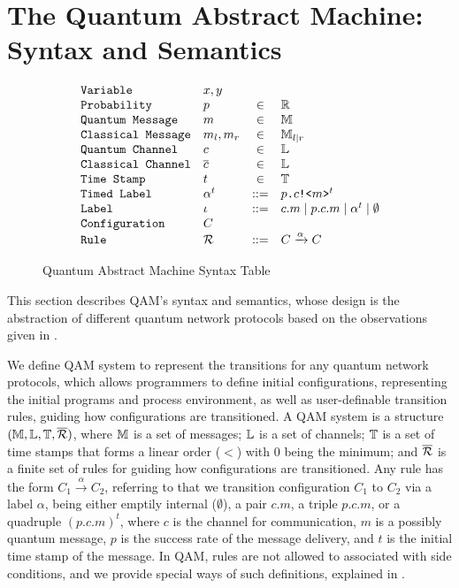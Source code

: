 \section{The Quantum Abstract Machine:  Syntax and Semantics} \label{sec:qam}

\begin{figure}[t]
{\small
  \[\begin{array}{llcl} 
      \texttt{Variable} & x,y \\
      \texttt{Probability} & p &\in &\mathbb{R}\\
      \texttt{Quantum Message} & m &\in& \mathbb{M}\\
      \texttt{Classical Message} & m_l,m_r &\in& \mathbb{M}_{l\mid r}\\
    \texttt{Quantum Channel} & c &\in& \mathbb{L}\\
    \texttt{Classical Channel} & \overline{c} &\in& \mathbb{L}\\
    \texttt{Time Stamp} & t &\in& \mathbb{T}\\
    \texttt{Timed Label} & \alpha^t &::=& p\texttt{.}c\texttt{!<}m\texttt{>}^{t}\\
    \texttt{Label} & \iota &::=& c.m \mid p.c.m \mid \alpha^t \mid \emptyset\\
      \texttt{Configuration} & C & \\
      \texttt{Rule} & \mathcal{R} & ::= & C \xrightarrow{\alpha} C 
    \end{array}
  \]
}
\caption{Quantum Abstract Machine Syntax Table}
  \label{fig:q-pi-syntax}
\end{figure}

This section describes QAM's syntax and semantics, whose design is the abstraction of different quantum network protocols based on the observations given in .

We define QAM system to represent the transitions for any quantum network protocols, which allows programmers to define initial configurations, representing the initial programs and process environment, as well as user-definable transition rules, guiding how configurations are transitioned. A QAM system is a structure $(\mathbb{M},\mathbb{L},\mathbb{T},\overline{\mathcal{R}})$,
where $\mathbb{M}$ is a set of messages;
$\mathbb{L}$ is a set of channels;
$\mathbb{T}$ is a set of time stamps that forms a linear order ($<$) with $0$ being the minimum;
and $\overline{\mathcal{R}}$ is a finite set of rules for guiding how configurations are transitioned. 
Any rule has the form $C_1 \xrightarrow{\alpha} C_2$, referring to that we transition configuration $C_1$ to $C_2$ via a label $\alpha$, being either emptily internal ($\emptyset$), a pair $c.m$, a triple $p.c.m$, or a quadruple $(p.c.m)^t$, where $c$ is the channel for communication, $m$ is a possibly quantum message, $p$ is the success rate of the message delivery, and $t$ is the initial time stamp of the message. In QAM, rules are not allowed to associated with side conditions, and we provide special ways of such definitions, explained in .

